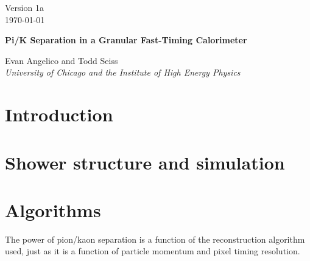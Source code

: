 \documentclass[12pt,twoside,letterpaper]{article}
\begin{document}
\vspace*{-3.5cm}
\begin{flushright}
Version 1a\\
\today
\end{flushright}


\begin{center}
  \begin{large}
  {\bf Pi/K Separation in a Granular Fast-Timing Calorimeter}
  \end{large}
\end{center}


\begin{center}
Evan Angelico and Todd Seiss\\
\emph{University of Chicago and the Institute of High Energy Physics}
\end{center}

\begin{abstract}
This is a note that describes a portion of the work performed from June 14-27th of 2017 at a U. of Chicago/CEPC collaborative workshop. The goal was to learn what the separation power of pions and kaons could be using time of flight and the present conceptual design of the CEPC detector. By scanning the phase space of pixel timing resolution and initial particle momentum, we produced an algorithm dependent measure pion/kaon separation. 
\end{abstract}


\vspace{0.1in}



\section{Introduction}

\section{Shower structure and simulation}

\section{Algorithms}

The power of pion/kaon separation is a function of the reconstruction algorithm used, just as it is a function of particle momentum and pixel timing resolution. 
\end{document}
